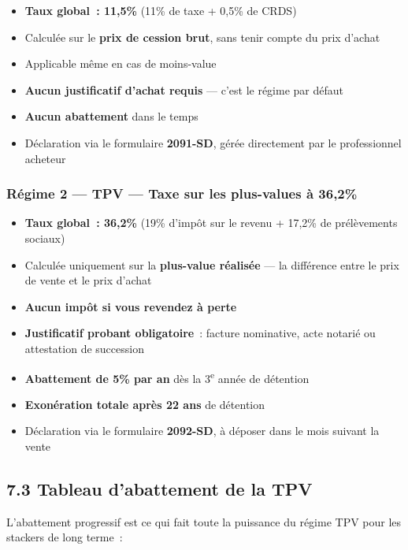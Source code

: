 \documentclass[14pt,a4paper]{extarticle}
\begin{document}
\begin{itemize}
  \item \textbf{Taux global~: 11,5\%} (11\% de taxe + 0,5\% de CRDS)
  \item Calculée sur le \textbf{prix de cession brut}, sans tenir compte du prix d'achat
  \item Applicable même en cas de moins-value
  \item \textbf{Aucun justificatif d'achat requis} --- c'est le régime par défaut
  \item \textbf{Aucun abattement} dans le temps
  \item Déclaration via le formulaire \textbf{2091-SD}, gérée directement par le professionnel acheteur
\end{itemize}

\subsubsection*{Régime 2 — TPV — Taxe sur les plus-values à 36,2\%}

\begin{itemize}
  \item \textbf{Taux global~: 36,2\%} (19\% d'impôt sur le revenu + 17,2\% de prélèvements sociaux)
  \item Calculée uniquement sur la \textbf{plus-value réalisée} --- la différence entre le prix de vente et le prix d'achat
  \item \textbf{Aucun impôt si vous revendez à perte}
  \item \textbf{Justificatif probant obligatoire}~: facture nominative, acte notarié ou attestation de succession
  \item \textbf{Abattement de 5\% par an} dès la 3\textsuperscript{e} année de détention
  \item \textbf{Exonération totale après 22 ans} de détention
  \item Déclaration via le formulaire \textbf{2092-SD}, à déposer dans le mois suivant la vente
\end{itemize}

\subsection{7.3 Tableau d'abattement de la TPV}

L'abattement progressif est ce qui fait toute la puissance du régime TPV pour les stackers de long terme~:
\end{document}
